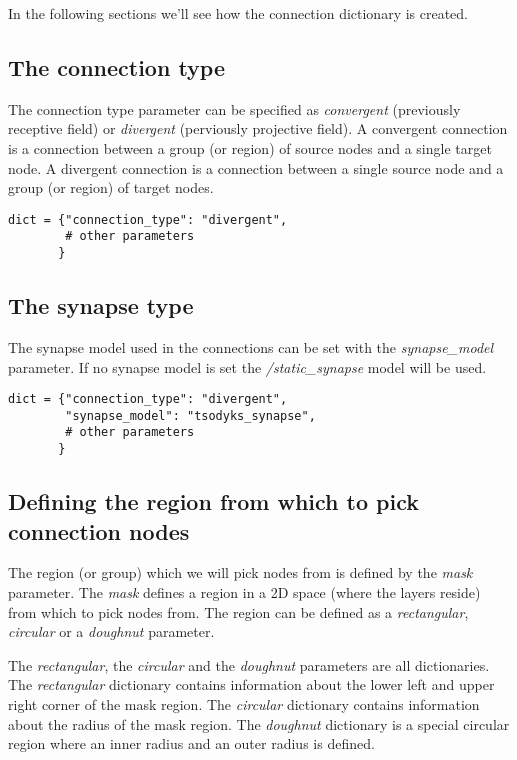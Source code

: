 \documentclass{article}
\begin{document}
In the following sections we'll see how the connection dictionary is created.

\subsection{The connection type}

The connection type parameter can be specified as \emph{convergent} (previously receptive field) or \emph{divergent} (perviously projective field). A convergent connection is a connection between a group (or region) of source nodes and a single target node. A divergent connection is a connection between a single source node and a group (or region) of target nodes. 

\begin{verbatim}
dict = {"connection_type": "divergent",
        # other parameters
       }
\end{verbatim}

\subsection{The synapse type}

The synapse model used in the connections can be set with the \emph{synapse\_model} parameter. If no synapse model is set the \emph{/static\_synapse} model will be used.

\begin{verbatim}
dict = {"connection_type": "divergent",
        "synapse_model": "tsodyks_synapse",
        # other parameters
       }
\end{verbatim}

\subsection{Defining the region from which to pick connection nodes}

The region (or group) which we will pick nodes from is defined by the \emph{mask} parameter. The \emph{mask} defines a region in a 2D space (where the layers reside) from which to pick nodes from. The region can be defined as a \emph{rectangular}, \emph{circular} or a \emph{doughnut} parameter.

The \emph{rectangular}, the \emph{circular} and the \emph{doughnut} parameters are all dictionaries. The \emph{rectangular} dictionary contains information about the lower left and upper right corner of the mask region. The \emph{circular} dictionary contains information about the radius of the mask region. The \emph{doughnut} dictionary is a special circular region where an inner radius and an outer radius is defined. 
\end{document}

